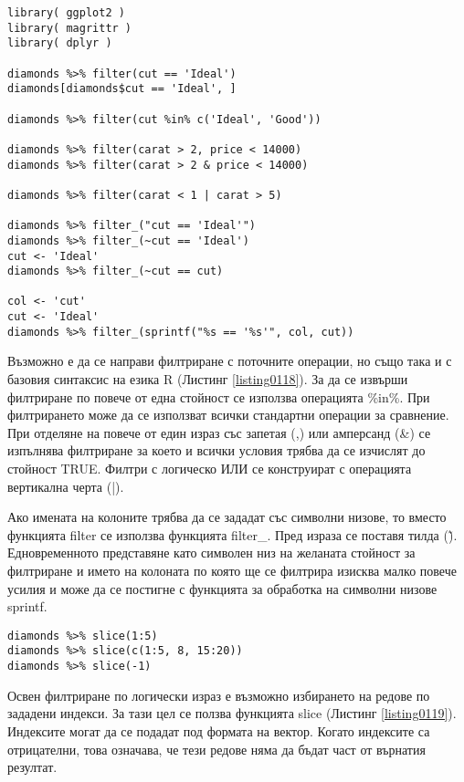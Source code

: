 \begin{lstlisting}[caption=Филтриране на редове, label=listing0118]
library( ggplot2 )
library( magrittr )
library( dplyr )

diamonds %>% filter(cut == 'Ideal')
diamonds[diamonds$cut == 'Ideal', ]

diamonds %>% filter(cut %in% c('Ideal', 'Good'))

diamonds %>% filter(carat > 2, price < 14000)
diamonds %>% filter(carat > 2 & price < 14000)

diamonds %>% filter(carat < 1 | carat > 5)

diamonds %>% filter_("cut == 'Ideal'")
diamonds %>% filter_(~cut == 'Ideal')
cut <- 'Ideal'
diamonds %>% filter_(~cut == cut)

col <- 'cut'
cut <- 'Ideal'
diamonds %>% filter_(sprintf("%s == '%s'", col, cut))
\end{lstlisting}

Възможно е да се направи филтриране с поточните операции, но също така и с базовия синтаксис на езика R (Листинг \ref{listing0118}). За да се извърши филтриране по повече от една стойност се използва операцията \%in\%. При филтрирането може да се използват всички стандартни операции за сравнение. При отделяне на повече от един израз със запетая (,) или амперсанд (\&) се изпълнява филтриране за което и всички условия трябва да се изчислят до стойност TRUE. Филтри с логическо ИЛИ се конструират с операцията вертикална черта (|).

Ако имената на колоните трябва да се зададат със символни низове, то вместо функцията filter се използва функцията filter\_. Пред израза се поставя тилда (\~). Едновременното представяне като символен низ на желаната стойност за филтриране и името на колоната по която ще се филтрира изисква малко повече усилия и може да се постигне с функцията за обработка на символни низове sprintf.

\begin{lstlisting}[caption=Избор по индекси, label=listing0119]
diamonds %>% slice(1:5)
diamonds %>% slice(c(1:5, 8, 15:20))
diamonds %>% slice(-1)
\end{lstlisting}

Освен филтриране по логически израз е възможно избирането на редове по зададени индекси. За тази цел се ползва функцията slice (Листинг \ref{listing0119}). Индексите могат да се подадат под формата на вектор. Когато индексите са отрицателни, това означава, че тези редове няма да бъдат част от върнатия резултат.

